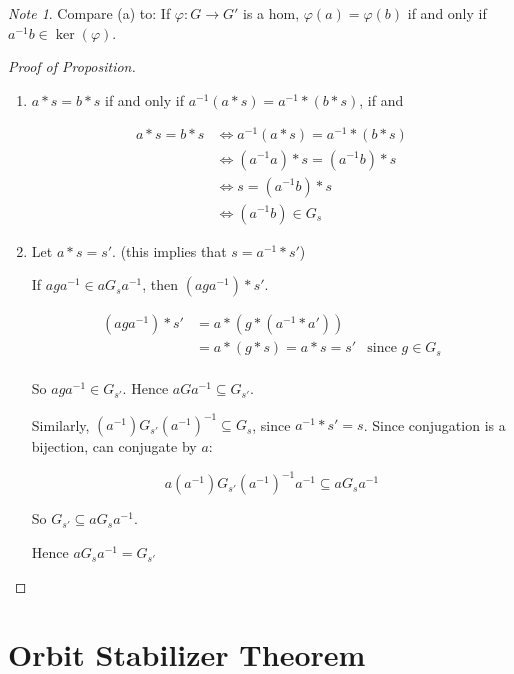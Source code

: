 \documentclass[12pt]{article}
\def\phi{\varphi}
\theoremstyle{remark}
\theoremstyle{remark}
\theoremstyle{remark}
\theoremstyle{remark}
\theoremstyle{remark}
\newtheorem*{note}{Note}
\begin{document}
\begin{note}
  Compare (a) to: If $\phi: G \to G'$ is a hom, $\phi(a) = \phi(b)$ if and only
  if $a^{-1} b \in \ker(\phi)$.
\end{note}

\begin{proof}[Proof of Proposition]
  \begin{enumerate}
    \item $a * s = b * s$ if and only if $a^{-1} (a * s) = a^{-1} * (b * s)$, if
      and

      \begin{align*}
        a * s = b * s &\Leftrightarrow a^{-1} (a * s) = a^{-1} * (b * s) \\
                      &\Leftrightarrow (a^{-1} a) * s = (a^{-1} b) * s \\
                      &\Leftrightarrow s = (a^{-1} b) * s \\
                      &\Leftrightarrow (a^{-1} b) \in G_s
      \end{align*}

    \item Let $a * s = s'$. (this implies that $s = a^{-1} * s'$)

      If $aga^{-1} \in a G_s a^{-1}$, then $(aga^{-1}) * s'$.

      \begin{align*}
        (aga^{-1}) * s' &= a * (g * (a^{-1} * a')) \\
                        &= a * (g * s) = a * s = s' &\text{since $g \in G_s$} \\
      \end{align*}

      So $aga^{-1} \in G_{s'}$. Hence $a G a^{-1} \subseteq G_{s'}$.

      Similarly, $(a^{-1}) G_{s'}(a^{-1})^{-1} \subseteq G_s$, since $a^{-1} *  s'
      = s$. Since conjugation is a bijection, can conjugate by $a$:

      \[
        a(a^{-1}) G_{s'}(a^{-1})^{-1}a^{-1} \subseteq a G_s a^{-1}
      \]

      So $G_{s'} \subseteq a G_s a^{-1}$.

      Hence $a G_s a^{-1} = G_{s'}$
  \end{enumerate}
\end{proof}

\section{Orbit Stabilizer Theorem}
\end{document}
